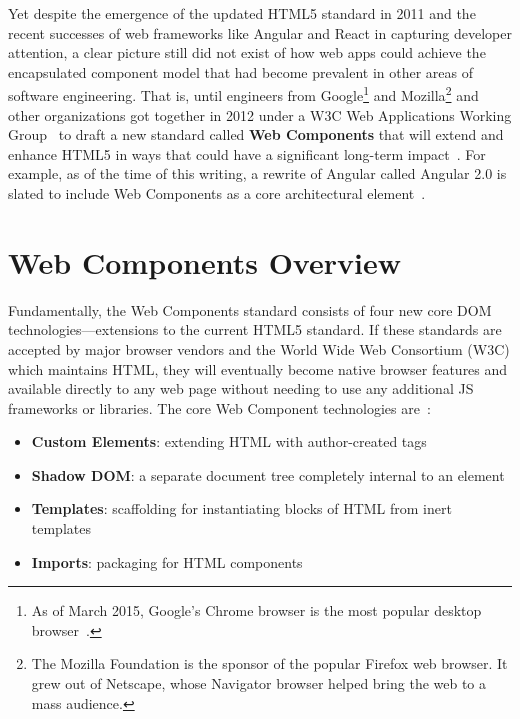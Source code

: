 Yet despite the emergence of the updated HTML5 standard in 2011 and the recent successes of web frameworks like Angular and React in capturing developer attention, 
a clear picture still did not exist of how web apps could achieve the encapsulated component model that had become prevalent in other areas of software engineering.
That is, until engineers from Google\footnote{
As of March 2015, Google's Chrome browser is the most popular desktop browser~\cite{zachte2015}.}
and Mozilla\footnote{
The Mozilla Foundation is the sponsor of the popular Firefox web browser. It grew out of Netscape, whose Navigator browser helped bring the web to a mass audience.}
and other organizations got together in 2012 under a W3C Web Applications Working Group~\cite{w3c2015} 
to draft a new standard called \textbf{Web Components} that will extend and enhance HTML5 in ways that could have a significant long-term impact~\cite{yveslafon2015}. 
For example, as of the time of this writing, a rewrite of Angular called Angular 2.0 is slated to include Web Components as a core architectural element~\cite{santiagoesteva2015}.

\section{Web Components Overview}
Fundamentally, the Web Components standard consists of four new core DOM technologies---extensions to the current HTML5 standard.
If these standards are accepted by major browser vendors and the World Wide Web Consortium (W3C)
which maintains HTML, 
they will eventually become native browser features and available directly to any web page without needing to use any additional JS frameworks or libraries. 
The core Web Component technologies are~\cite{penades2015}:
\begin{itemize}
\item
\textbf{Custom Elements}: extending HTML with author-created tags
\item
\textbf{Shadow DOM}: a separate document tree completely internal to an element
\item
\textbf{Templates}: scaffolding for instantiating blocks of HTML from inert templates
\item
\textbf{Imports}: packaging for HTML components
\end{itemize}

